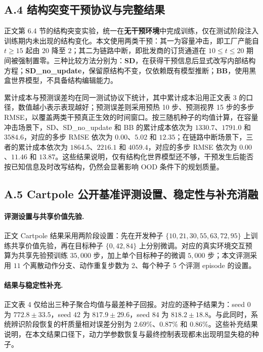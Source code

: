 \documentclass[UTF8]{ctexart}
\let\oldparagraph\paragraph
\renewcommand{\paragraph}[1]{\oldparagraph{#1}\mbox{}}
\begin{document}
\hypertarget{a.4-structural-intervention-protocol-and-results}{%
\subsection{A.4 结构突变干预协议与完整结果}\label{a.4-structural-intervention-protocol-and-results}}

正文第 6.4 节的结构突变实验，统一在\textbf{无干预环境}中完成训练，仅在测试阶段注入训练期内未出现的结构变化。本文使用两类干预：其一为容量冲击，即工厂产能自 \(t\ge 15\) 起由 \(20\) 降至 \(2\)；其二为链路中断，即批发商的订货通道在 \(10\le t\le 20\) 期间被强制置零。三种比较方法分别为：\textbf{SD}，在获得干预信息后显式改写内部结构方程；\textbf{SD\_no\_update}，保留原结构不变，仅依赖既有模型推断；\textbf{BB}，使用黑盒世界模型，不具备结构编辑能力。

累计成本与预测误差均在同一测试协议下统计，其中累计成本沿用正文表 3 的口径，数值越小表示表现越好；预测误差则采用预热 10 步、预测视界 15 步的多步 RMSE，以覆盖两类干预真正生效的时间窗口。按三随机种子的均值计算，在容量冲击场景下，SD、SD\_no\_update 和 BB 的累计成本依次为 \(1330.7\)、\(1791.0\) 和 \(3584.6\)，对应的多步 RMSE 依次为 \(0.00\)、\(5.02\) 和 \(12.35\)；在链路中断场景下，三者的累计成本依次为 \(1864.5\)、\(2216.1\) 和 \(4059.4\)，对应的多步 RMSE 依次为 \(0.00\)、\(11.46\) 和 \(13.87\)。这些结果说明，仅有结构化世界模型还不够，干预发生后能否按已知信息及时改写结构，仍然会显著影响 OOD 条件下的规划质量。

\hypertarget{a.5-cartpole-protocol-and-ablation}{%
\subsection{A.5 Cartpole 公开基准评测设置、稳定性与补充消融}\label{a.5-cartpole-protocol-and-ablation}}

\paragraph{评测设置与共享价值先验.}
正文 Cartpole 结果采用两阶段设置：先在开发种子 \(\{10,21,30,55,63,72,95\}\) 上训练共享价值先验，再在目标种子 \(\{0,42,84\}\) 上分别微调。对应的真实环境交互预算为共享先验预训练 \(35{,}000\) 步，加上单个目标种子的微调 \(5{,}000\) 步；本文评测采用 \(11\) 个离散动作分支、动作重复步数为 2、每个种子 5 个评测 episode 的设置。

\paragraph{结果与稳定性补充.}
正文表 4 仅给出三种子聚合均值与最差种子回报。对应的逐种子结果为：seed \(0\) 为 \(772.8\pm33.5\)，seed \(42\) 为 \(817.9\pm29.6\)，seed \(84\) 为 \(818.2\pm18.8\)。与此同时，系统辨识阶段恢复的杆质量相对误差分别为 \(2.69\%\)、\(0.87\%\) 和 \(0.86\%\)。这些补充结果说明，在本文结果口径下，动力学参数恢复与最终控制表现都未出现明显失稳的种子。
\end{document}
